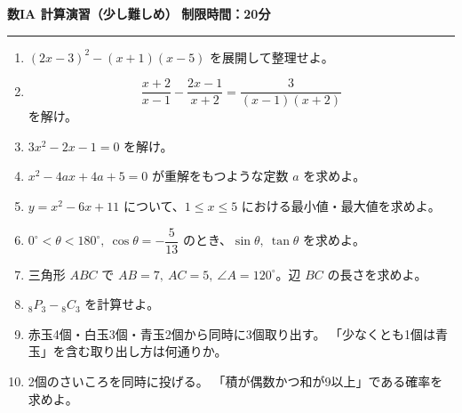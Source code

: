 \documentclass[lualatex,ja=standard]{bxjsarticle}
\begin{document}
\noindent\textbf{数IA 計算演習（少し難しめ）}
\hfill\textbf{制限時間：20分}
\hrule
\vspace{0.8em}

\begin{enumerate}
\item $ (2x-3)^2-(x+1)(x-5) $ を展開して整理せよ。

\item
\[
\frac{x+2}{x-1}-\frac{2x-1}{x+2}=\frac{3}{(x-1)(x+2)}
\]
を解け。

\item $ 3x^2-2x-1=0 $ を解け。

\item $ x^2-4ax+4a+5=0 $ が重解をもつような定数 $a$ を求めよ。

\item $ y=x^2-6x+11 $ について、$1\le x\le 5$ における最小値・最大値を求めよ。

\item $0^\circ<\theta<180^\circ,\ \cos\theta=-\dfrac{5}{13}$ のとき、$\sin\theta,\ \tan\theta$ を求めよ。

\item 三角形 $ABC$ で $AB=7,\ AC=5,\ \angle A=120^\circ$。辺 $BC$ の長さを求めよ。

\item $ {}_8P_3-{}_8C_3 $ を計算せよ。

\item 赤玉4個・白玉3個・青玉2個から同時に3個取り出す。
「少なくとも1個は青玉」を含む取り出し方は何通りか。

\item 2個のさいころを同時に投げる。
「積が偶数かつ和が9以上」である確率を求めよ。
\end{enumerate}
\end{document}
